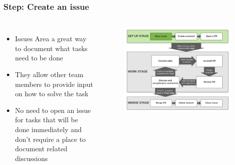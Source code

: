 \documentclass[aspectratio=169]{beamer} %
\begin{document}
\begin{frame}
	\frametitle{Step: Create an issue}
	\begin{columns}[c]
		
		\begin{itemize}
			\setlength\itemsep{.5em}
			\item Issues Area a great way to document what tasks need to be done
			\item They allow other team members to provide input on how to solve the task
			\item No need to open an issue for tasks that will be done immediately and don't require a place to document related discussions
		\end{itemize}
		
		\vspace{-.75cm}
		\begin{figure}
			\centering
			\includegraphics[width=\textwidth]{./img/branch-pr-merge-cycle-S1-1.png}
		\end{figure}
		
	\end{columns}
\end{frame}
\end{document}
